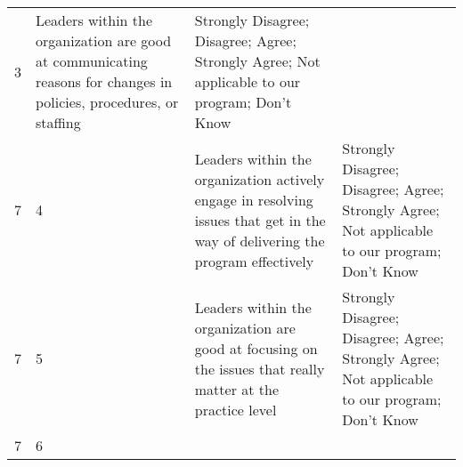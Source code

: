 \documentclass[]{article}
\begin{document}
\begin{longtable}[]{@{}llll@{}}
\begin{minipage}[t]{0.04\columnwidth}
3\strut
\end{minipage} & \begin{minipage}[t]{0.41\columnwidth}\raggedright\strut
Leaders within the organization are good at communicating reasons for
changes in policies, procedures, or staffing\strut
\end{minipage} & \begin{minipage}[t]{0.39\columnwidth}\raggedright\strut
Strongly Disagree; Disagree; Agree; Strongly Agree; Not applicable to
our program; Don't Know\strut
\end{minipage}\tabularnewline
\begin{minipage}[t]{0.05\columnwidth}\raggedright\strut
7\strut
\end{minipage} & \begin{minipage}[t]{0.04\columnwidth}\raggedright\strut
4\strut
\end{minipage} & \begin{minipage}[t]{0.41\columnwidth}\raggedright\strut
Leaders within the organization actively engage in resolving issues that
get in the way of delivering the program effectively\strut
\end{minipage} & \begin{minipage}[t]{0.39\columnwidth}\raggedright\strut
Strongly Disagree; Disagree; Agree; Strongly Agree; Not applicable to
our program; Don't Know\strut
\end{minipage}\tabularnewline
\begin{minipage}[t]{0.05\columnwidth}\raggedright\strut
7\strut
\end{minipage} & \begin{minipage}[t]{0.04\columnwidth}\raggedright\strut
5\strut
\end{minipage} & \begin{minipage}[t]{0.41\columnwidth}\raggedright\strut
Leaders within the organization are good at focusing on the issues that
really matter at the practice level\strut
\end{minipage} & \begin{minipage}[t]{0.39\columnwidth}\raggedright\strut
Strongly Disagree; Disagree; Agree; Strongly Agree; Not applicable to
our program; Don't Know\strut
\end{minipage}\tabularnewline
\begin{minipage}[t]{0.05\columnwidth}\raggedright\strut
7\strut
\end{minipage} & \begin{minipage}[t]{0.04\columnwidth}\raggedright\strut
6\strut
\end{minipage} & \begin{minipage}[t]{0.41\columnwidth}\raggedright\strut

\end{minipage}
\end{longtable}
\end{document}
